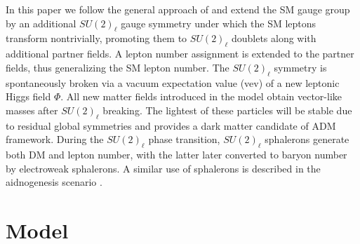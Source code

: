 \documentclass[prd,showpcs,amsmath,amssymb,nofootinbib,preprintnumbers,balancelastpage,longbibliography,superscriptaddress,notitlepage]{revtex4}
\begin{document}
In this paper we follow the general approach of \cite{Fornal:2016boa} and extend the SM gauge group by an additional $SU(2)_{\ell}$ gauge symmetry under which the SM leptons transform nontrivially, promoting them to $SU(2)_{\ell}$ doublets along with additional partner fields.  A lepton number assignment is extended to the partner fields, thus generalizing the SM lepton number.  The $SU(2)_{\ell}$ symmetry is spontaneously broken via a vacuum expectation value (vev) of a new leptonic Higgs field $\Phi$. All new matter fields introduced in the model obtain vector-like masses after $SU(2)_\ell$ breaking. The lightest of these particles will be stable due to residual global symmetries and provides a dark matter candidate of ADM framework. During the $SU(2)_\ell$ phase transition, $SU(2)_\ell$ sphalerons generate both DM and lepton number, with the latter later converted to baryon number by electroweak sphalerons.  A similar use of sphalerons is described in the aidnogenesis scenario \cite{Blennow:2010qp}.

\section{Model}
\label{sec:model}
\end{document}
